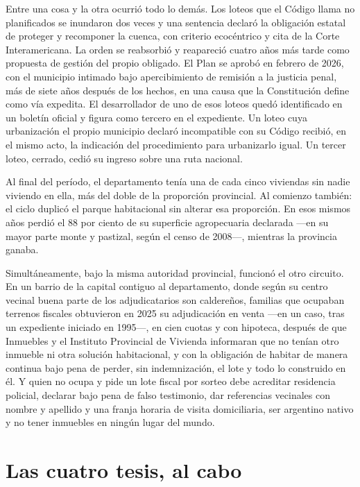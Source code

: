 Entre una cosa y la otra ocurrió todo lo demás. Los loteos que el Código llama no planificados se inundaron dos veces y una sentencia declaró la obligación estatal de proteger y recomponer la cuenca, con criterio ecocéntrico y cita de la Corte Interamericana. La orden se reabsorbió y reapareció cuatro años más tarde como propuesta de gestión del propio obligado. El Plan se aprobó en febrero de 2026, con el municipio intimado bajo apercibimiento de remisión a la justicia penal, más de siete años después de los hechos, en una causa que la Constitución define como vía expedita. El desarrollador de uno de esos loteos quedó identificado en un boletín oficial y figura como tercero en el expediente. Un loteo cuya urbanización el propio municipio declaró incompatible con su Código recibió, en el mismo acto, la indicación del procedimiento para urbanizarlo igual. Un tercer loteo, cerrado, cedió su ingreso sobre una ruta nacional.

Al final del período, el departamento tenía una de cada cinco viviendas sin nadie viviendo en ella, más del doble de la proporción provincial. Al comienzo también: el ciclo duplicó el parque habitacional sin alterar esa proporción. En esos mismos años perdió el 88 por ciento de su superficie agropecuaria declarada ---en su mayor parte monte y pastizal, según el censo de 2008---, mientras la provincia ganaba.

Simultáneamente, bajo la misma autoridad provincial, funcionó el otro circuito. En un barrio de la capital contiguo al departamento, donde según su centro vecinal buena parte de los adjudicatarios son caldereños, familias que ocupaban terrenos fiscales obtuvieron en 2025 su adjudicación en venta ---en un caso, tras un expediente iniciado en 1995---, en cien cuotas y con hipoteca, después de que Inmuebles y el Instituto Provincial de Vivienda informaran que no tenían otro inmueble ni otra solución habitacional, y con la obligación de habitar de manera continua bajo pena de perder, sin indemnización, el lote y todo lo construido en él. Y quien no ocupa y pide un lote fiscal por sorteo debe acreditar residencia policial, declarar bajo pena de falso testimonio, dar referencias vecinales con nombre y apellido y una franja horaria de visita domiciliaria, ser argentino nativo y no tener inmuebles en ningún lugar del mundo.

\section{Las cuatro tesis, al cabo}

